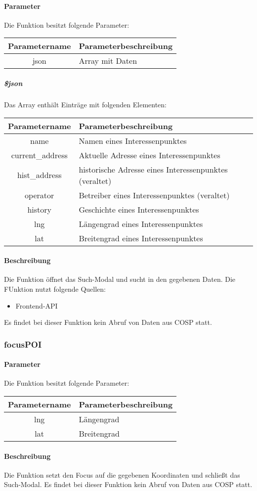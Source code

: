 \paragraph{Parameter} Die Funktion besitzt folgende Parameter:
\begin{table}[H]
	\begin{tabular}{|c|p{11cm}|}
		\hline
		\textbf{Parametername} & \textbf{Parameterbeschreibung} \\ \hline
		json & Array mit Daten \\ \hline
	\end{tabular}
\end{table}
\subparagraph{\$json}Das Array enthält Einträge mit folgenden Elementen:
\begin{table}[H]
	\begin{tabular}{|c|p{11cm}|}
		\hline
		\textbf{Parametername} & \textbf{Parameterbeschreibung} \\ \hline
		name             & Namen eines Interessenpunktes  \\ \hline
		current\_address & Aktuelle Adresse eines Interessenpunktes  \\ \hline
		hist\_address    & historische Adresse eines Interessenpunktes (veraltet) \\ \hline
		operator         & Betreiber eines Interessenpunktes (veraltet) \\ \hline
		history          & Geschichte eines Interessenpunktes \\ \hline
		lng              & Längengrad eines Interessenpunktes \\ \hline
		lat              & Breitengrad eines Interessenpunktes \\ \hline
	\end{tabular}
\end{table}
\paragraph{Beschreibung} Die Funktion öffnet das Such-Modal und sucht in den gegebenen Daten. Die FUnktion nutzt folgende Quellen:
\begin{itemize}
	\item Frontend-API
\end{itemize}
Es findet bei dieser Funktion kein Abruf von Daten aus {\glqq COSP\grqq} statt.
\subsubsection{focusPOI}
\paragraph{Parameter} Die Funktion besitzt folgende Parameter:
\begin{table}[H]
	\begin{tabular}{|c|p{11cm}|}
		\hline
		\textbf{Parametername} & \textbf{Parameterbeschreibung} \\ \hline
		lng & Längengrad \\ \hline
		lat & Breitengrad \\ \hline
	\end{tabular}
\end{table}
\paragraph{Beschreibung} Die Funktion setzt den Focus auf die gegebenen Koordinaten und schließt das Such-Modal. Es findet bei dieser Funktion kein Abruf von Daten aus {\glqq COSP\grqq} statt.
